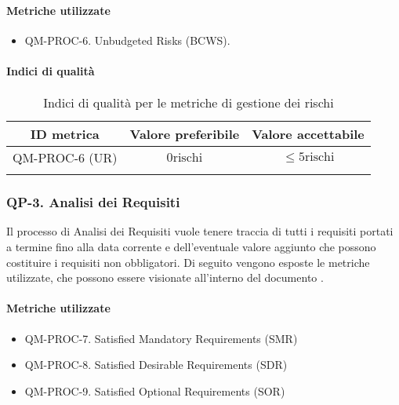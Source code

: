 		\paragraph{Metriche utilizzate}

			\begin{itemize}
				\item QM-PROC-6. Unbudgeted Risks (BCWS).
			\end{itemize}

		\paragraph{Indici di qualità}

			\begin{center}
				\begin{longtable}{|c|c|c|}
				\hline
				\rowcolor{lighter-grayer}
				\textbf{ID metrica} & \textbf{Valore preferibile} & \textbf{Valore accettabile}\\
				\hline
				\endfirsthead
				\hline
				QM-PROC-6 (UR) & \(0 \text{rischi}\) & \(\le 5 \text{rischi}\) \\
				\hline
				\caption{Indici di qualità per le metriche di gestione dei rischi}
				\end{longtable}
			\end{center}

	\subsubsection{QP-3. Analisi dei Requisiti}

		Il processo di Analisi dei Requisiti vuole tenere traccia di tutti i requisiti portati a termine fino alla data corrente e dell'eventuale valore aggiunto che possono costituire i requisiti non obbligatori.
		Di seguito vengono esposte le metriche utilizzate, che possono essere visionate all'interno del documento .

		\paragraph{Metriche utilizzate}

			\begin{itemize}
				\item QM-PROC-7. Satisfied Mandatory Requirements (SMR)
				\item QM-PROC-8. Satisfied Desirable Requirements (SDR)
				\item QM-PROC-9. Satisfied Optional Requirements (SOR)
			\end{itemize}


